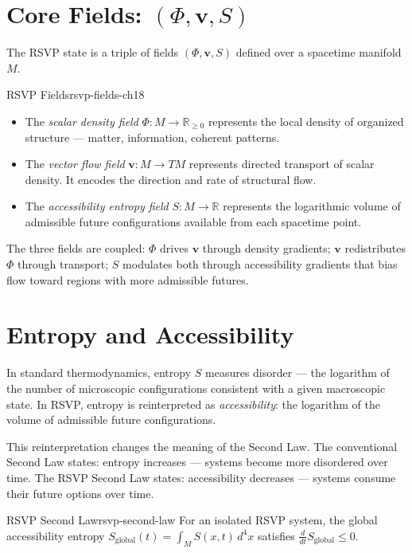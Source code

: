 \section{Core Fields: \texorpdfstring{$(\Phi, \mathbf{v}, S)$}{(Phi, v, S)}}

The RSVP state is a triple of fields $(\Phi, \mathbf{v}, S)$ defined over
a spacetime manifold $M$.

\begin{definition}{RSVP Fields}{rsvp-fields-ch18}
  \begin{itemize}
    \item The \emph{scalar density field} $\Phi : M \to \mathbb{R}_{\geq 0}$
          represents the local density of organized structure — matter,
          information, coherent patterns.
    \item The \emph{vector flow field} $\mathbf{v} : M \to TM$
          represents directed transport of scalar density. It encodes
          the direction and rate of structural flow.
    \item The \emph{accessibility entropy field} $S : M \to \mathbb{R}$
          represents the logarithmic volume of admissible future
          configurations available from each spacetime point.
  \end{itemize}
\end{definition}

The three fields are coupled: $\Phi$ drives $\mathbf{v}$ through density
gradients; $\mathbf{v}$ redistributes $\Phi$ through transport; $S$ modulates
both through accessibility gradients that bias flow toward regions with more
admissible futures.

\section{Entropy and Accessibility}

In standard thermodynamics, entropy $S$ measures disorder — the logarithm
of the number of microscopic configurations consistent with a given
macroscopic state. In RSVP, entropy is reinterpreted as \emph{accessibility}:
the logarithm of the volume of admissible future configurations.

This reinterpretation changes the meaning of the Second Law. The conventional
Second Law states: entropy increases — systems become more disordered over
time. The RSVP Second Law states: accessibility decreases — systems consume
their future options over time.

\begin{definition}{RSVP Second Law}{rsvp-second-law}
  For an isolated RSVP system, the global accessibility entropy
  $S_\text{global}(t) = \int_M S(x,t)\,d^4x$ satisfies
  $\frac{d}{dt} S_\text{global} \leq 0$.
\end{definition}

